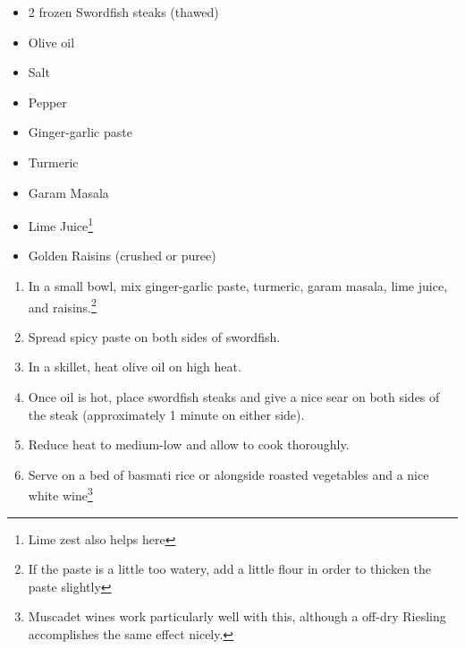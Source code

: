 \documentclass[oneside]{recipe}
\newcommand{\recipecolumn}[2]{
	\begin{multicols}{2}
	\raggedcolumns
	#1
	\columnbreak
	#2
	\end{multicols}
}
\begin{document}
\recipecolumn{
	\begin{itemize}
		\item 2 frozen Swordfish steaks (thawed)
		\item Olive oil
		\item Salt
		\item Pepper
		\item Ginger-garlic paste
		\item Turmeric
		\item Garam Masala
		\item Lime Juice\footnote{Lime zest also helps here}
		\item Golden Raisins (crushed or puree)
	\end{itemize}
}{
	\begin{enumerate}
		\item In a small bowl, mix ginger-garlic paste, turmeric, garam masala, lime juice, and raisins.\footnote{If the paste is a little too watery, add a little flour in order to thicken the paste slightly}
		\item Spread spicy paste on both sides of swordfish.
		\item In a skillet, heat olive oil on high heat. 
		\item Once oil is hot, place swordfish steaks and give a nice sear on both sides of the steak (approximately 1 minute on either side).
		\item Reduce heat to medium-low and allow to cook thoroughly. 
		\item Serve on a bed of basmati rice or alongside roasted vegetables and a nice white wine\footnote{Muscadet wines work particularly well with this, although a off-dry Riesling accomplishes the same effect nicely.}
	\end{enumerate}
}
\end{document}
